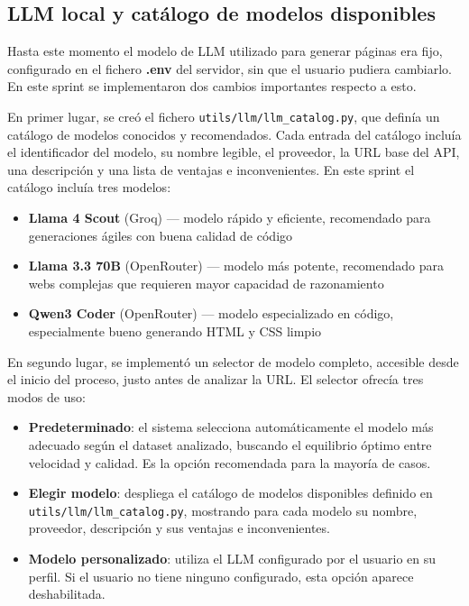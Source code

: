 \subsection{LLM local y catálogo de modelos disponibles}
\label{subsec:llm-local-catalogo-modelos}

Hasta este momento el modelo de LLM utilizado para generar páginas era fijo, configurado en el fichero \textbf{.env} del servidor, sin que el usuario pudiera cambiarlo. En este sprint se implementaron dos cambios importantes respecto a esto.

En primer lugar, se creó el fichero \texttt{utils/llm/llm\_catalog.py}, que definía un catálogo de modelos conocidos y recomendados. Cada entrada del catálogo incluía el identificador del modelo, su nombre legible, el proveedor, la URL base del API, una descripción y una lista de ventajas e inconvenientes. En este sprint el catálogo incluía tres modelos:

\begin{itemize}
    \item \textbf{Llama 4 Scout} (Groq) — modelo rápido y eficiente, recomendado para generaciones ágiles con buena calidad de código
    \item \textbf{Llama 3.3 70B} (OpenRouter) — modelo más potente, recomendado para webs complejas que requieren mayor capacidad de razonamiento
    \item \textbf{Qwen3 Coder} (OpenRouter) — modelo especializado en código, especialmente bueno generando HTML y CSS limpio
\end{itemize}


En segundo lugar, se implementó un selector de modelo completo, accesible desde el inicio del proceso, justo antes de analizar la URL. El selector ofrecía tres modos de uso:

\begin{itemize}
    \item \textbf{Predeterminado}: el sistema selecciona automáticamente el 
    modelo más adecuado según el dataset analizado, buscando el equilibrio 
    óptimo entre velocidad y calidad. Es la opción recomendada para la 
    mayoría de casos.
    
    \item \textbf{Elegir modelo}: despliega el catálogo de modelos disponibles 
    definido en \\ \texttt{utils/llm/llm\_catalog.py}, mostrando para cada modelo 
    su nombre, proveedor, descripción y sus ventajas e inconvenientes.
    
    \item \textbf{Modelo personalizado}: utiliza el LLM configurado por el 
    usuario en su perfil. Si el usuario no tiene ninguno configurado, esta 
    opción aparece deshabilitada.
\end{itemize}

